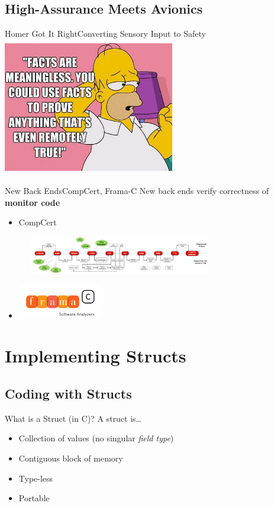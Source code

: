 \documentclass[xcolor={dvipsnames}]{beamer}
\begin{document}
\subsection[High-Assurance Monitors]{High-Assurance Meets Avionics}

\begin{frame}{Homer Got It Right}{Converting Sensory Input to Safety}
  \centering\includegraphics[width=7.5cm, height=6.0cm]{Homer_Simpson}
\end{frame}
\begin{frame}{New Back Ends}{CompCert, Frama-C}
  New back ends \alert{verify correctness} of \textbf{monitor code}
  \begin{itemize}
  \item
    CompCert
    
    \includegraphics[width=9.0cm, height=1.65cm]{CompCert_Pipeline}
  \item
    \includegraphics[width=3.75cm, height=1.5cm]{FramaC_logo}
  \end{itemize}
\end{frame}

\section{Implementing Structs}
\subsection{Coding with Structs}
\begin{frame}{What is a Struct (in C)?}
  A struct is\dots
  \begin{itemize}
  \item
    Collection of values (no singular \emph{field type})
  \item
    \alert{Contiguous block} of memory
  \item
    Type-less
  \item
    Portable
  \end{itemize}
\end{frame}
\end{document}
